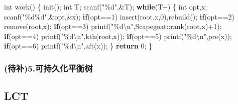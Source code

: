 \documentclass[
]{article}
\newenvironment{Shaded}{}{}
\newcommand{\ControlFlowTok}[1]{\textcolor[rgb]{0.00,0.44,0.13}{\textbf{#1}}}
\newcommand{\DataTypeTok}[1]{\textcolor[rgb]{0.56,0.13,0.00}{#1}}
\newcommand{\DecValTok}[1]{\textcolor[rgb]{0.25,0.63,0.44}{#1}}
\newcommand{\NormalTok}[1]{#1}
\newcommand{\SpecialCharTok}[1]{\textcolor[rgb]{0.25,0.44,0.63}{#1}}
\newcommand{\StringTok}[1]{\textcolor[rgb]{0.25,0.44,0.63}{#1}}
\begin{document}
\begin{Shaded}
\begin{Highlighting}[]
\DataTypeTok{int}\NormalTok{ work()}
\NormalTok{\{}
\NormalTok{    init();}
    \DataTypeTok{int}\NormalTok{ T;}
\NormalTok{    scanf(}\StringTok{"}\SpecialCharTok{\%d}\StringTok{"}\NormalTok{,\&T);}
    \ControlFlowTok{while}\NormalTok{(T{-}{-})}
\NormalTok{    \{}
        \DataTypeTok{int}\NormalTok{ opt,x; scanf(}\StringTok{"}\SpecialCharTok{\%d\%d}\StringTok{"}\NormalTok{,\&opt,\&x);}
        \ControlFlowTok{if}\NormalTok{(opt==}\DecValTok{1}\NormalTok{) insert(root,x,}\DecValTok{0}\NormalTok{),rebuild();}
        \ControlFlowTok{if}\NormalTok{(opt==}\DecValTok{2}\NormalTok{) remove(root,x);}
        \ControlFlowTok{if}\NormalTok{(opt==}\DecValTok{3}\NormalTok{) printf(}\StringTok{"}\SpecialCharTok{\%d\textbackslash{}n}\StringTok{"}\NormalTok{,Scapegoat::rank(root,x)+}\DecValTok{1}\NormalTok{);}
        \ControlFlowTok{if}\NormalTok{(opt==}\DecValTok{4}\NormalTok{) printf(}\StringTok{"}\SpecialCharTok{\%d\textbackslash{}n}\StringTok{"}\NormalTok{,kth(root,x));}
        \ControlFlowTok{if}\NormalTok{(opt==}\DecValTok{5}\NormalTok{) printf(}\StringTok{"}\SpecialCharTok{\%d\textbackslash{}n}\StringTok{"}\NormalTok{,pre(x));}
        \ControlFlowTok{if}\NormalTok{(opt==}\DecValTok{6}\NormalTok{) printf(}\StringTok{"}\SpecialCharTok{\%d\textbackslash{}n}\StringTok{"}\NormalTok{,aft(x));}
\NormalTok{    \}}
    \ControlFlowTok{return} \DecValTok{0}\NormalTok{;}
\NormalTok{\}}
\end{Highlighting}
\end{Shaded}

\hypertarget{ux5f85ux88655.ux53efux6301ux4e45ux5316ux5e73ux8861ux6811}{%
\subsubsection{(待补)5.可持久化平衡树}\label{ux5f85ux88655.ux53efux6301ux4e45ux5316ux5e73ux8861ux6811}}

\hypertarget{lct}{%
\subsection{LCT}\label{lct}}
\end{document}
